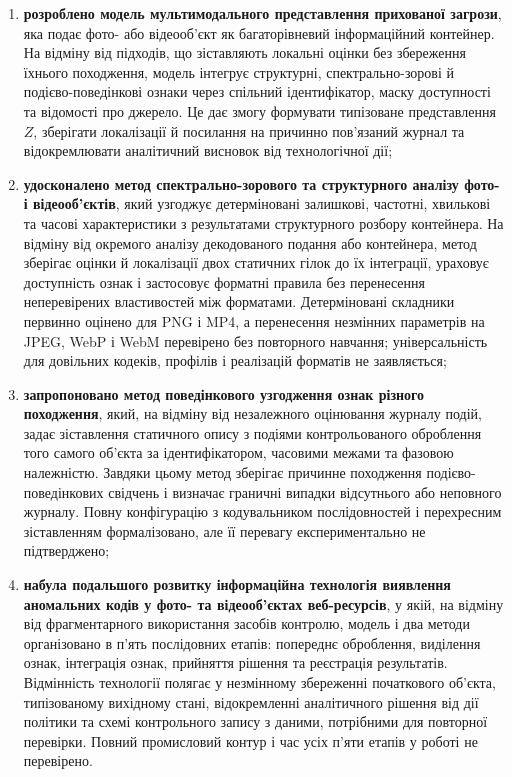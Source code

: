 \begin{enumerate}[label=\arabic*)]
\item \textbf{розроблено модель мультимодального представлення прихованої загрози}, яка подає фото- або відеооб’єкт як багаторівневий інформаційний контейнер. На відміну від підходів, що зіставляють локальні оцінки без збереження їхнього походження, модель інтегрує структурні, спектрально-зорові й подієво-поведінкові ознаки через спільний ідентифікатор, маску доступності та відомості про джерело. Це дає змогу формувати типізоване представлення $Z$, зберігати локалізації й посилання на причинно пов’язаний журнал та відокремлювати аналітичний висновок від технологічної дії;

\item \textbf{удосконалено метод спектрально-зорового та структурного аналізу фото- і відеооб’єктів}, який узгоджує детерміновані залишкові, частотні, хвилькові та часові характеристики з результатами структурного розбору контейнера. На відміну від окремого аналізу декодованого подання або контейнера, метод зберігає оцінки й локалізації двох статичних гілок до їх інтеграції, ураховує доступність ознак і застосовує форматні правила без перенесення неперевірених властивостей між форматами. Детерміновані складники первинно оцінено для PNG і MP4, а перенесення незмінних параметрів на JPEG, WebP і WebM перевірено без повторного навчання; універсальність для довільних кодеків, профілів і реалізацій форматів не заявляється;

\item \textbf{запропоновано метод поведінкового узгодження ознак різного походження}, який, на відміну від незалежного оцінювання журналу подій, задає зіставлення статичного опису з подіями контрольованого оброблення того самого об’єкта за ідентифікатором, часовими межами та фазовою належністю. Завдяки цьому метод зберігає причинне походження подієво-поведінкових свідчень і визначає граничні випадки відсутнього або неповного журналу. Повну конфігурацію з кодувальником послідовностей і перехресним зіставленням формалізовано, але її перевагу експериментально не підтверджено;

\item \textbf{набула подальшого розвитку інформаційна технологія виявлення аномальних кодів у фото- та відеооб’єктах веб-ресурсів}, у якій, на відміну від фрагментарного використання засобів контролю, модель і два методи організовано в п’ять послідовних етапів: попереднє оброблення, виділення ознак, інтеграція ознак, прийняття рішення та реєстрація результатів. Відмінність технології полягає у незмінному збереженні початкового об’єкта, типізованому вихідному стані, відокремленні аналітичного рішення від дії політики та схемі контрольного запису з даними, потрібними для повторної перевірки. Повний промисловий контур і час усіх п’яти етапів у роботі не перевірено.
\end{enumerate}

